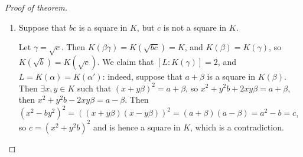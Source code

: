 \documentclass{article}
\theoremstyle{definition}
\theoremstyle{plain}%
\theoremstyle{remark}
\begin{document}
\begin{proof}[Proof of theorem]
\begin{enumerate}
        \begin{proof}
            We have that $B = (x + y\sqrt{A})^2 = x^2 + Ay^2 + 2xy\sqrt{A}$. But since $B \in F$, either $x, y = 0$. If $y = 0$, then $B$ is a square in $F$. If $x = 0$, then $B = y^2A$, so $BA = y^2A^2 = (yA)^2$ is a square in $F$.
        \end{proof}
        
        Suppose for a contradiction $\alpha' \in K(\alpha)$ - i.e. $a - \sqrt{b}$ is a square in $K(\alpha) = K(\beta)\sqrt{a + \sqrt{b}}$. Applying the lemma with $F = K(\beta)$, $A = a + \sqrt{b}$, $B = a - \sqrt{b}$. Then either $B$ is square in $F$, which is a contradiction, or $AB$ is square in $F$, i.e. $AB = a^2 -b = c$ is a square in $K(\beta)$. Apply the lemma again with $F = K$, $A = b$ and $B = c$. Then either $c$ is a square in $K$, which is a contradiction or $bc$ is a square in $K$, which is a contradiction. So $\alpha' \not \in K(\alpha)$.
        
        So $[L : K] = 8$, and $|G| = 8$.
        
        Now we want $G = D_8$.
        
        Let $\sigma \in G$. We have $\sigma(\beta) = \pm \beta$.
        
        If $\sigma(\beta) = \beta$ then $\sigma(\alpha) = \pm\alpha$ and $\sigma(\alpha') = \pm \alpha'$. 
        
        If $\sigma(\beta) = -\beta$ then $\sigma(\alpha) = \pm \alpha'$ and $\sigma(\alpha') = \pm \alpha$.
        
        But since $|G| = 8$, and there are 8 total permutations, all of these permutations are elements of $G$. These permutations are symmetries of a square with $\alpha, \alpha', -\alpha, -\alpha'$, so $G = D_8$. Let $\tau$ be the reflection that sends $\alpha' \mapsto -\alpha'$, and $\sigma$ the rotation that sends $\alpha \mapsto \alpha'$.
        
        We can find the subfields from the different combinations of symmetries, and what they fix. See appendix.
        
        
        
        \item Suppose that $bc$ is a square in $K$, but $c$ is not a square in $K$.
        
        Let $\gamma = \sqrt{c}$. Then $K(\beta\gamma) = K(\sqrt{bc}) = K$, and $K(\beta) = K(\gamma)$, so $K(\sqrt{b}) = K(\sqrt{c})$. We claim that $[L : K(\gamma)] = 2$, and $L = K(\alpha) = K(\alpha')$: indeed, suppose that $a + \beta$ is a square in $K(\beta)$. Then $\exists x,y \in K$ such that $(x + y\beta)^2 = a + \beta$, so $x^2 + y^2b + 2xy\beta = a + \beta$, then $x^2 + y^2b - 2xy\beta = a - \beta$. Then $(x^2 - by^2)^2 = ((x+ y\beta)(x-y\beta))^2 = (a + \beta)(a - \beta) = a^2-b = c$, so $c = (x^2 + y^2b)^2$ and is hence a square in $K$, which is a contradiction.
        

\end{enumerate}
\end{proof}
\end{document}
